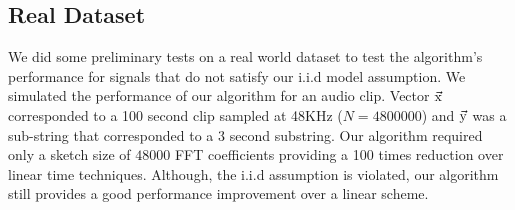 \subsection{Real Dataset}
We did some preliminary tests on a real world dataset to test the algorithm's performance for signals that do not satisfy our i.i.d model assumption. We simulated the performance of our algorithm for an audio clip. Vector $\vec{\mathrm{x}}$ corresponded to a 100 second clip sampled at 48KHz ($N=4800000$) and $\vec{\mathrm{y}}$ was a sub-string that corresponded to a 3 second substring. Our algorithm required only a sketch size of $48000$ FFT coefficients providing a 100 times reduction over linear time techniques. Although, the i.i.d assumption is violated, our algorithm still provides a good performance improvement over a linear scheme. 

 		